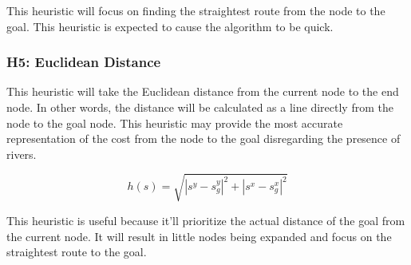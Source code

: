 This heuristic will focus on finding the straightest route from the node to the goal. This heuristic is expected to cause the algorithm to be quick.

\subsubsection{H5: Euclidean Distance}
This heuristic will take the Euclidean distance from the current node to the end node. In other words, the distance will be calculated as a line directly from the node to the goal node. This heuristic may provide the most accurate representation of the cost from the node to the goal disregarding the presence of rivers.

\[h(s) =  \sqrt{|s^y - s_g^y|^2 + |s^x - s_g^x|^2 } \]

This heuristic is useful because it'll prioritize the actual distance of the goal from the current node. It will result in little nodes being expanded and focus on the straightest route to the goal.
